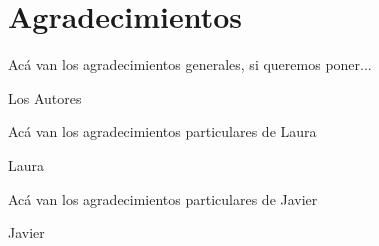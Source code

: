 \documentclass[11pt]{report}
\begin{document}
\chapter*{Agradecimientos} %

\begin{flushright}
Acá van los agradecimientos generales, si queremos poner...
\end{flushright}

\begin{flushright}
Los Autores
\end{flushright}

\begin{flushright}
Acá van los agradecimientos particulares de Laura
\end{flushright}

\begin{flushright}
Laura
\end{flushright}

\begin{flushright}
Acá van los agradecimientos particulares de Javier
\end{flushright}

\begin{flushright}
Javier
\end{flushright}



\tableofcontents
















{}
%

\listoffigures
\end{document}
